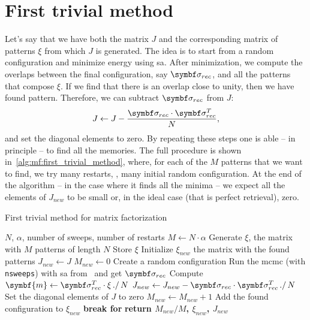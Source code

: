 \documentclass[\rootdir/main.tex]{subfiles}
\begin{document}
\section{First trivial method}
Let's say that we have both the matrix $J$ and the corresponding matrix of patterns $\xi$ from which $J$ is generated. The idea is to start from a random configuration \bsigma and minimize energy using \acrlong{sa}. After minimization, we compute the overlaps between the final configuration, say $\bsigma_{rec}$, and all the patterns \bxi that compose $\xi$.  If we find that there is an overlap close to unity, then we have found pattern. Therefore, we can subtract $\bsigma_{rec}$ from $J$:
\begin{equation}\label{eq:unlearning_rule}
    J \gets J - \frac{\bsigma_{rec} \cdot \bsigma_{rec}^{T}}{N},
\end{equation}
and set the diagonal elements to zero.
By repeating these steps one is able -- in principle -- to find all the memories.
The full procedure is shown in~\cref{alg:mf:first_trivial_method}, where, for each of the $M$ patterns that we want to find, we try many restarts, \ie, many initial random configuration. At the end of the algorithm -- in the case where it finds all the minima -- we expect all the elements of $J_{new}$ to be small or, in the ideal case (that is perfect retrieval), zero. 
\begin{algorithm}
    \caption{First trivial method for matrix factorization}
    \label{alg:mf:first_trivial_method}
    \begin{algorithmic}[1]
    \Require $N$, $\alpha$,
    number of sweeps, number of restarts
    \State $M \gets N \cdot \alpha$
    \State Generate $\xi$, the matrix with $M$ patterns of length $N$
    \State Store $\xi$ 
    \State Initialize $\xi_{new}$ the matrix with the found patterns
    \State $J_{new} \gets J$ 
    \State $M_{new} \gets 0$ 
            \State Create a random configuration \bsigma
            \State Run the \acrshort{mcmc} (with \texttt{nsweeps}) with \acrshort{sa} from \bsigma\ and get $\bsigma_{rec}$
            \State Compute $ \symbf{m} \gets \bsigma_{rec}^T \cdot \xi \, ./\, N$ 
                \State $J_{new} \gets J_{new} - \bsigma_{rec} \cdot \bsigma_{rec}^{T} \, ./ \, N$
                \State Set the diagonal elements of $J$ to zero
                \State $M_{new} \gets M_{new} + 1$
                \State Add the found configuration to $\xi_{new}$
                \State \textbf{break for} 
            \EndIf
        \EndFor
    \EndFor
    \State \textbf{return $M_{new}/M$, $\xi_{new}$, $J_{new}$}
\end{algorithmic}
\end{algorithm}
\end{document}
